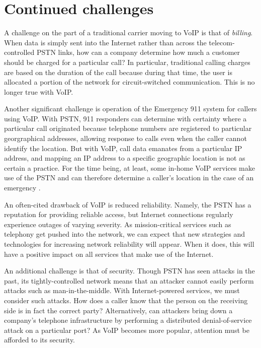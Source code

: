\documentclass[11pt]{article}
\begin{document}
\section{Continued challenges}

A challenge on the part of a traditional carrier moving to VoIP is that of
\emph{billing}. When data is simply sent into the Internet rather than across
the telecom-controlled PSTN links, how can a company determine how much a
customer should be charged for a particular call? In particular, traditional
calling charges are based on the duration of the call because during that time,
the user is allocated a portion of the network for circuit-switched
communication. This is no longer true with VoIP. \cite{theregister}

Another significant challenge is operation of the Emergency 911 system for
callers using VoIP. With PSTN, 911 responders can determine with certainty where
a particular call originated because telephone numbers are registered to
particular georgraphical addresses, allowing response to calls even when the
caller cannot identify the location. But with VoIP, call data emanates from a
particular IP address, and mapping an IP address to a specific geographic
location is not as certain a practice. \cite{howstuffworks} For the time being,
at least, some in-home VoIP services make use of the PSTN and can therefore
determine a caller's location in the case of an emergency \cite{us_cert}.

An often-cited drawback of VoIP is reduced reliability. Namely, the PSTN has a
reputation for providing reliable access, but Internet connections regularly
experience outages of varying severity. \cite{howstuffworks} As mission-critical
services such as telephony get pushed into the network, we can expect that new
strategies and technologies for increasing network reliability will appear. When
it does, this will have a positive impact on all services that make use of the
Internet.

An additional challenge is that of security. Though PSTN has seen attacks in the
past, its tightly-controlled network means that an attacker cannot easily
perform attacks such as man-in-the-middle. With Internet-powered services, we
must consider such attacks. How does a caller know that the person on the
receiving side is in fact the correct party? Alternatively, can attackers bring
down a company's telephone infrastructure by performing a distributed
denial-of-service attack on a particular port? As VoIP becomes more popular,
attention must be afforded to its security.
\end{document}

